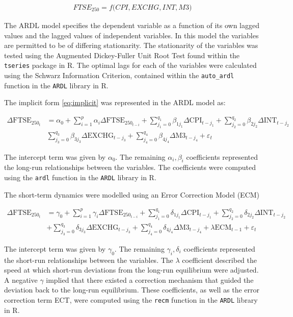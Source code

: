 \documentclass[11pt,a4paper]{article}
\begin{document}
\begin{align}
    FTSE_{250} = f\biggl(CPI, EXCHG, INT, M3\biggr) \label{eq:implicit}
\end{align}

The ARDL model specifies the dependent variable as a function of its own 
lagged values and the lagged values of independent variables. 
In this model the variables are permitted to be of differing stationarity. The stationarity 
of the variables was tested using the Augmented Dickey-Fuller 
Unit Root Test found within the \texttt{tseries} package in R. The optimal lags for each of the 
variables were calculated using the Schwarz Information Criterion, contained
within the \texttt{auto\_ardl} function in the \texttt{ARDL} library in R. 

The implicit form \eqref{eq:implicit} was represented in the ARDL model as:

\begin{align*}
    \Delta \text{FTSE}_{250_t} &= \alpha_0 + \sum_{i=1}^{p} \alpha_i \Delta \text{FTSE}_{250_{t-i}} + \sum_{j_{1}=0}^{q_1} \beta_{1j_{1}} \Delta \text{CPI}_{t-j_{1}} + \sum_{j_{2}=0}^{q_2} \beta_{2j_{2}} \Delta \text{INT}_{t-j_{2}} \\
                               & \sum_{j_{3}=0}^{q_3} \beta_{3j_{3}} \Delta \text{EXCHG}_{t-j_{3}} + \sum_{j_{4}=0}^{q_4} \beta_{4j_{4}} \Delta \text{M3}_{t-j_{4}} + \varepsilon_t 
\end{align*}

The intercept term was given by $\alpha_0$. The 
remaining $\alpha_i, \beta_i$ coefficients represented the long-run relationships 
between the variables. The coefficients were computed using the \texttt{ardl} function in the 
\texttt{ARDL} library in R. 

The short-term dynamics were modelled using an Error Correction Model (ECM) 

\begin{align*}
    \Delta \text{FTSE}_{250_t} &= \gamma_0 + \sum_{i=1}^{p} \gamma_i \Delta \text{FTSE}_{250_{t-i}} + \sum_{j_{1}=0}^{q_1} \delta_{1j_{1}} \Delta \text{CPI}_{t-j_{1}} + \sum_{j_{2}=0}^{q_2} \delta_{2j_{2}} \Delta \text{INT}_{t-j_{2}} \\
                               & + \sum_{j_{3}=0}^{q_3} \delta_{3j_{3}} \Delta \text{EXCHG}_{t-j_{3}} + \sum_{j_{4}=0}^{q_4} \delta_{4j_{4}} \Delta \text{M3}_{t-j_{4}} + \lambda \text{ECM}_{t-1} + \varepsilon_t
\end{align*}
 
The intercept term was given by $\gamma_0$. The 
remaining $\gamma_i, \delta_i$ coefficients represented the short-run 
relationships between the variables. The $\lambda$ coefficient 
described the speed at which short-run deviations from the long-run equilibrium
were adjusted. A negative $\gamma$ implied that there existed a correction mechanism that guided the deviation 
back to the long-run equilibrium. These coefficients, as well 
as the error correction term ECT, were computed using the \texttt{recm} function in the 
\texttt{ARDL} library in R.
\end{document}
